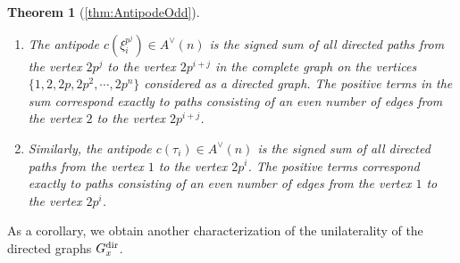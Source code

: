\documentclass{amsart}
\newtheorem*{thm*}{Theorem}
\theoremstyle{definition}
\theoremstyle{plain}
\numberwithin{theorem}{section}
\numberwithin{equation}{section}
\numberwithin{figure}{section}
\newcommand{\0}{\langle 0 \rangle }
\begin{document}
\begin{thm*}[\cref{thm:AntipodeOdd}]
\hfill

    \begin{enumerate}
        \item[I.] %
        The antipode $c(\xi_i^{p^j}) \in A^\vee(n)$ is the signed sum of all directed paths from the vertex $2 p^j$ to the vertex $2 p^{i + j}$ in the complete graph on the vertices $\{1,2, 2p, 2p^2, \cdots, 2p^n\}$ considered as a directed graph. The positive terms in the sum correspond exactly to paths consisting of an even number of edges from the vertex $2$ to the vertex $2p^{i +j}$.

    \item[II.] Similarly, the antipode $c(\tau_i) \in A^\vee(n)$ is the signed sum of all directed paths from the vertex $1$ to the vertex $2 p^{i}$. The positive terms correspond exactly to paths consisting of an even number of edges from the vertex $1$ to the vertex $2 p^i$.
    \end{enumerate}

    \color{black}
\end{thm*}

As a corollary, we obtain another characterization of the unilaterality of the directed graphs $G_x^\textup{dir}$.
\end{document}
